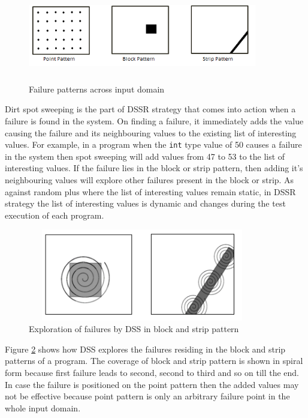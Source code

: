 \begin{figure}[ht]                                    
\centering
\includegraphics[width= 10cm,height=4cm]{chapter4/ART_Patterns.png}
\caption{Failure patterns across input domain~\cite{chan1996proportional}}
\label{fig:patterns3}
\end{figure}

Dirt spot sweeping is the part of DSSR strategy that comes into action when a failure is found in the system. On finding a failure, it immediately adds the value causing the failure and its neighbouring values to the existing list of interesting values. For example, in a program when the \verb+int+ type value of 50 causes a failure in the system then spot sweeping will add values from 47 to 53 to the list of interesting values. If the failure lies in the block or strip pattern, then adding it's neighbouring values will explore other failures present in the block or strip. As against random plus where the list of interesting values remain static, in DSSR strategy the list of interesting values is dynamic and changes during the test execution of each program.

\begin{figure}[ht]
\centering
\includegraphics[width=10cm,height=4cm]{chapter4/block2.png}
\caption{Exploration of failures by DSS in block and strip pattern}
\label{fig:block2}
\end{figure}

Figure \ref{fig:block2} shows how DSS explores the failures residing in the block and strip patterns of a program. The coverage of block and strip pattern is shown in spiral form because first failure leads to second, second to third and so on till the end. In case the failure is positioned on the point pattern then the added values may not be effective because point pattern is only an arbitrary failure point in the whole input domain.

